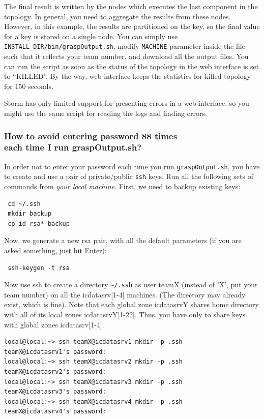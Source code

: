 \documentclass[a4paper,10pt]{article}
\begin{document}
The final result is written by the nodes which executes the last component in the topology. In general, you need to aggregate the results from these nodes. However, in this example, the results are partitioned on the key, so the final value for a key is stored on a single node. You can simply use \verb#INSTALL_DIR/bin/graspOutput.sh#, modify \verb#MACHINE# parameter inside the file such that it reflects your team number, and download all the output files. You can run the script as soon as the status of the topology in the web interface is set to ``KILLED''. By the way, web interface keeps the statistics for killed topology for 150 seconds. 

Storm has only limited support for presenting errors in a web interface, so you might use the same script for reading the logs and finding errors.

\subsubsection{How to avoid entering password 88 times \\ each time I run graspOutput.sh?} In order not to enter your password each time you run \verb#graspOutput.sh#, you have to create and use a pair of private/public \verb|ssh| keys. Run all the following sets of commands from \textit{your local machine}. First, we need to backup existing keys:
\begin{verbatim}
 cd ~/.ssh
 mkdir backup
 cp id_rsa* backup
\end{verbatim}
Now, we generate a new rsa pair, with all the default parameters (if you are asked something, just hit Enter):
\begin{verbatim}
 ssh-keygen -t rsa
\end{verbatim}

Now use ssh to create a directory \verb|~/.ssh| as user teamX (instead of 'X', put your team number) on all the icdatasrv[1-4] machines. (The directory may already exist, which is fine). Note that each global zone icdatasrvY shares home directory with all of its local zones icdatasrvY[1-22]. Thus, you have only to share keys with global zones icdatasrv[1-4].
\begin{verbatim}
local@local:~> ssh teamX@icdatasrv1 mkdir -p .ssh
teamX@icdatasrv1's password: 
local@local:~> ssh teamX@icdatasrv2 mkdir -p .ssh
teamX@icdatasrv2's password: 
local@local:~> ssh teamX@icdatasrv3 mkdir -p .ssh
teamX@icdatasrv3's password: 
local@local:~> ssh teamX@icdatasrv4 mkdir -p .ssh
teamX@icdatasrv4's password: 
\end{verbatim}
\end{document}
